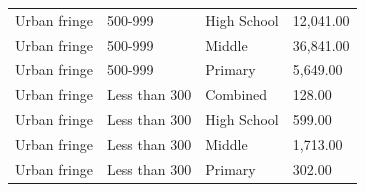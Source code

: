 \documentclass[
  man, fleqn, noextraspace]{apa6}
\begin{document}
\begin{table}[tbp]
\begin{center}
\begin{threeparttable}
\begin{tabular}{llll}
Urban fringe & 500-999 & High School & 12,041.00\\
Urban fringe & 500-999 & Middle & 36,841.00\\
Urban fringe & 500-999 & Primary & 5,649.00\\
Urban fringe & Less than 300 & Combined & 128.00\\
Urban fringe & Less than 300 & High School & 599.00\\
Urban fringe & Less than 300 & Middle & 1,713.00\\
Urban fringe & Less than 300 & Primary & 302.00\\
\bottomrule
\end{tabular}
\end{threeparttable}
\end{center}
\end{table}
\end{document}
